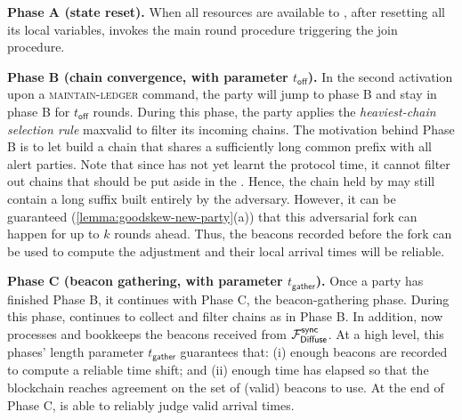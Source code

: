 \begin{cccItemize}[nosep]
      \item \textbf{Phase A (state reset).}
      When all resources are available to \party, after resetting all its local variables, \party invokes the main round procedure triggering the join procedure.

      \item \textbf{Phase B (chain convergence, with parameter $t_{\mathsf{off}}$).}
      In the second activation upon a \textsc{maintain-ledger} command, the party will jump to phase B and stay in phase B for $t_{\mathsf{off}}$ rounds.
      During this phase, the party applies the \emph{heaviest-chain selection rule} \textsf{maxvalid} to filter its incoming chains.
      The motivation behind Phase B is to let \party build a chain that shares a sufficiently long common prefix with all alert parties.
      Note that since \party has not yet learnt the protocol time, it cannot filter out chains that should be put aside in the \futureChains.
      Hence, the chain held by \party may still contain a long suffix built entirely by the adversary.
      However, it can be guaranteed (\cref{lemma:goodskew-new-party}(a)) that this adversarial fork can happen for up to $k$ rounds ahead.
      Thus, the beacons recorded before the fork can be used to compute the adjustment and their local arrival times will be reliable.

      \item \textbf{Phase C (beacon gathering, with parameter $t_{\mathsf{gather}}$).}
      Once a party \party has finished Phase B, it continues with Phase C, the beacon-gathering phase.
      During this phase, \party continues to collect and filter chains as in Phase B.
      In addition, \party now processes and bookkeeps the beacons received from $\mathcal{F}_{\mathsf{Diffuse}}^{\mathsf{sync}}$.
      At a high level, this phases' length parameter $t_{\mathsf{gather}}$ guarantees that: (i) enough beacons are recorded to compute a reliable time shift; and (ii) enough time has elapsed so that the blockchain reaches agreement on the set of (valid) beacons to use.
      At the end of Phase C, \party is able to reliably judge valid arrival times.


\end{cccItemize}

